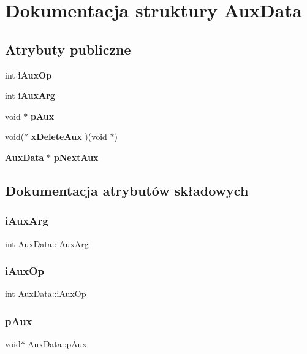 \section{Dokumentacja struktury Aux\+Data}
\label{struct_aux_data}
\subsection*{Atrybuty publiczne}
\begin{DoxyCompactItemize}
\item 
int \textbf{ i\+Aux\+Op}
\item 
int \textbf{ i\+Aux\+Arg}
\item 
void $\ast$ \textbf{ p\+Aux}
\item 
void($\ast$ \textbf{ x\+Delete\+Aux} )(void $\ast$)
\item 
\textbf{ Aux\+Data} $\ast$ \textbf{ p\+Next\+Aux}
\end{DoxyCompactItemize}


\subsection{Dokumentacja atrybutów składowych}
\mbox{\label{struct_aux_data_a517c90e8831eba9134d486ff9ca57248}} 
\subsubsection{iAuxArg}
{\footnotesize\ttfamily int Aux\+Data\+::i\+Aux\+Arg}

\mbox{\label{struct_aux_data_aa39240d49c18f6e31d7e83811ace1cdc}} 
\subsubsection{iAuxOp}
{\footnotesize\ttfamily int Aux\+Data\+::i\+Aux\+Op}

\mbox{\label{struct_aux_data_a3867fd2bd1f3795b14e858daa6754825}} 
\subsubsection{pAux}
{\footnotesize\ttfamily void$\ast$ Aux\+Data\+::p\+Aux}

\mbox{\label{struct_aux_data_ab562ec31ca37aa4bb11a5ce354731017}} 
